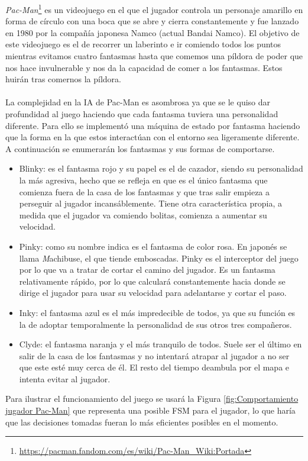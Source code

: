 \textit{Pac-Man}\footnote{\url{https://pacman.fandom.com/es/wiki/Pac-Man_Wiki:Portada}} es un videojuego en el que el jugador controla un personaje amarillo en forma de círculo con una boca que se abre y cierra constantemente y fue lanzado en 1980 por la compañía japonesa Namco (actual Bandai Namco). El objetivo de este videojuego es el de recorrer un laberinto e ir comiendo todos los puntos mientras evitamos cuatro fantasmas hasta que comemos una píldora de poder que nos hace invulnerable y nos da la capacidad de comer a los fantasmas. Estos huirán tras comernos la píldora.\\\\
La complejidad en la IA de Pac-Man es asombrosa ya que se le quiso dar profundidad al juego haciendo que cada fantasma tuviera una personalidad diferente. Para ello se implementó una máquina de estado por fantasma haciendo que la forma en la que estos interactúan con el entorno sea ligeramente diferente.
A continuación se enumerarán los fantasmas y sus formas de comportarse.
\begin{itemize}
	 \item Blinky: es el fantasma rojo y su papel es el de cazador, siendo su personalidad la más agresiva, hecho que se refleja en que es el único fantasma que comienza fuera de la casa de los fantasmas y que tras salir empieza a perseguir al jugador incansáblemente. Tiene otra característica propia, a medida que el jugador va comiendo bolitas, comienza a aumentar su velocidad.
	 \item Pinky: como su nombre indica es el fantasma de color rosa. En japonés se llama \textit Machibuse, el que tiende emboscadas. Pinky es el interceptor del juego por lo que va a tratar de cortar el camino del jugador. Es un fantasma relativamente rápido, por lo que calculará constantemente hacia donde se dirige el jugador para usar su velocidad para adelantarse y cortar el paso.
	 \item Inky: el fantasma azul es el más impredecible de todos, ya que su función es la de adoptar temporalmente la personalidad de sus otros tres compañeros.
	 \item Clyde: el fantasma naranja y el más tranquilo de todos. Suele ser el último en salir de la casa de los fantasmas y no intentará atrapar al jugador a no ser que este esté muy cerca de él. El resto del tiempo deambula por el mapa e intenta evitar al jugador.
\end{itemize}
Para ilustrar el funcionamiento del juego se usará la Figura \ref{fig:Comportamiento jugador Pac-Man} que representa una posible FSM para el jugador, lo que haría que las decisiones tomadas fueran lo más eficientes posibles en el momento.\\

